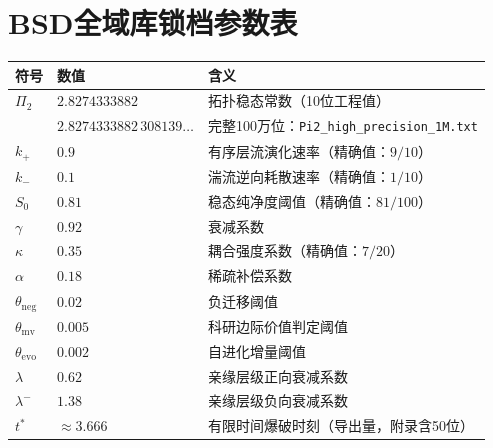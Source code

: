 \documentclass[11pt,a4paper]{ctexart}
\theoremstyle{remark}
\newcommand{\PiT}{\Pi_{2}}
\newcommand{\kplus}{k_{+}}
\newcommand{\kminus}{k_{-}}
\newcommand{\Szero}{S_{0}}
\begin{document}
\section*{BSD全域库锁档参数表}\label{sec:locked}

\begin{center}
\begin{tabular}{lll}
\toprule
符号 & 数值 & 含义 \\
\midrule
$\PiT$      & $2.8274333882$ & 拓扑稳态常数（10位工程值） \\
            & \footnotesize$2.8274333882\,308139\ldots$ & \footnotesize 完整100万位：\texttt{Pi2\_high\_precision\_1M.txt} \\
$\kplus$    & $0.9$          & 有序层流演化速率（精确值：$9/10$） \\
$\kminus$   & $0.1$          & 湍流逆向耗散速率（精确值：$1/10$） \\
$\Szero$    & $0.81$         & 稳态纯净度阈值（精确值：$81/100$） \\
$\gamma$    & $0.92$         & 衰减系数 \\
$\kappa$    & $0.35$         & 耦合强度系数（精确值：$7/20$） \\
$\alpha$    & $0.18$         & 稀疏补偿系数 \\
$\theta_{\mathrm{neg}}$ & $0.02$ & 负迁移阈值 \\
$\theta_{\mathrm{mv}}$  & $0.005$ & 科研边际价值判定阈值 \\
$\theta_{\mathrm{evo}}$ & $0.002$ & 自进化增量阈值 \\
$\lambda$   & $0.62$         & 亲缘层级正向衰减系数 \\
$\lambda^{-}$ & $1.38$       & 亲缘层级负向衰减系数 \\
$t^{*}$     & $\approx 3.666$ & 有限时间爆破时刻（导出量，附录含50位） \\
\bottomrule
\end{tabular}
\end{center}
\end{document}
